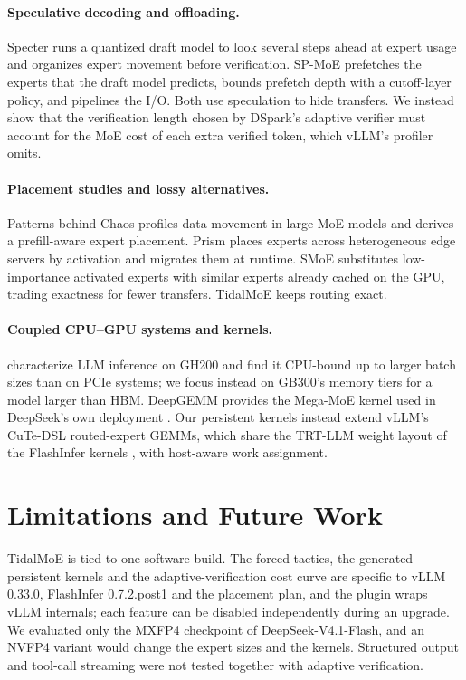 \documentclass{article}
\begin{document}
\paragraph{Speculative decoding and offloading.} Specter \citep{specter} runs a quantized draft model to look several
steps ahead at expert usage and organizes expert movement before verification. SP-MoE \citep{spmoe} prefetches the
experts that the draft model predicts, bounds prefetch depth with a cutoff-layer policy, and pipelines the I/O. Both use
speculation to hide transfers. We instead show that the verification length chosen by DSpark's adaptive verifier
\citep{dspark} must account for the MoE cost of each extra verified token, which vLLM's profiler omits.

\paragraph{Placement studies and lossy alternatives.} Patterns behind Chaos \citep{patternschaos} profiles data
movement in large MoE models and derives a prefill-aware expert placement. Prism \citep{edgeplacement} places experts
across heterogeneous edge servers by activation and migrates them at runtime. SMoE \citep{smoe} substitutes
low-importance activated experts with similar experts already cached on the GPU, trading exactness for fewer
transfers. TidalMoE keeps routing exact.

\paragraph{Coupled CPU--GPU systems and kernels.} \citet{coupledcpugpu} characterize LLM inference on GH200 and find it
CPU-bound up to larger batch sizes than on PCIe systems; we focus instead on GB300's memory tiers for a model larger
than HBM. DeepGEMM \citep{deepgemm} provides the Mega-MoE kernel used in DeepSeek's own deployment
\citep{deepseekv41}. Our persistent kernels instead extend vLLM's CuTe-DSL \citep{cutlass} routed-expert GEMMs, which
share the TRT-LLM weight layout of the FlashInfer kernels \citep{flashinfer}, with host-aware work assignment.

\section{Limitations and Future Work}\label{sec:limits}
TidalMoE is tied to one software build. The forced tactics, the generated persistent kernels and the
adaptive-verification cost curve are specific to vLLM 0.33.0, FlashInfer 0.7.2.post1 and the placement plan, and the
plugin wraps vLLM internals; each feature can be disabled independently during an upgrade. We evaluated only the MXFP4
checkpoint of DeepSeek-V4.1-Flash, and an NVFP4 variant would change the expert sizes and the kernels. Structured output
and tool-call streaming were not tested together with adaptive verification.
\end{document}
